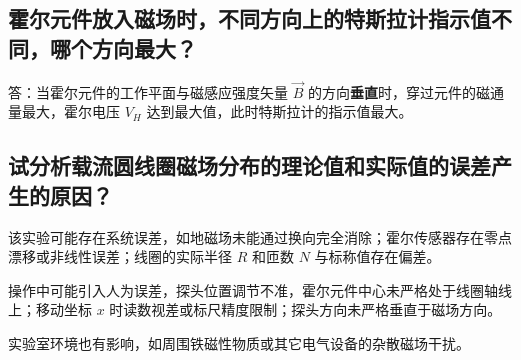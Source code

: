 \documentclass{../template/Report}%
\begin{document}
\begin{fullreportonly}
    \subsection{霍尔元件放入磁场时，不同方向上的特斯拉计指示值不同，哪个方向最大？}
    答：当霍尔元件的工作平面与磁感应强度矢量 $\vec{B}$ 的方向\textbf{垂直}时，穿过元件的磁通量最大，霍尔电压 $V_H$ 达到最大值，此时特斯拉计的指示值最大。

    \subsection{试分析载流圆线圈磁场分布的理论值和实际值的误差产生的原因？}
    该实验可能存在系统误差，如地磁场未能通过换向完全消除；霍尔传感器存在零点漂移或非线性误差；线圈的实际半径 $R$ 和匝数 $N$ 与标称值存在偏差。

    操作中可能引入人为误差，探头位置调节不准，霍尔元件中心未严格处于线圈轴线上；移动坐标 $x$ 时读数视差或标尺精度限制；探头方向未严格垂直于磁场方向。

    实验室环境也有影响，如周围铁磁性物质或其它电气设备的杂散磁场干扰。
\end{fullreportonly}
\insertnotes
\end{document}
